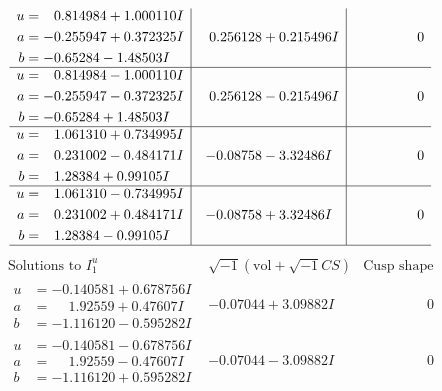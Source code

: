 \documentclass[1p]{elsarticle_modified}
\theoremstyle{definition}
\newcommand{\I}{\sqrt{-1}}
\begin{document}
$$\begin{array}{c|c|c}
\begin{aligned}
u &= \phantom{-}0.814984 + 1.000110 I \\
a &= -0.255947 + 0.372325 I \\
b &= -0.65284 - 1.48503 I\end{aligned}
 & \phantom{-}0.256128 + 0.215496 I & \phantom{-0.000000 } 0 \\ \hline\begin{aligned}
u &= \phantom{-}0.814984 - 1.000110 I \\
a &= -0.255947 - 0.372325 I \\
b &= -0.65284 + 1.48503 I\end{aligned}
 & \phantom{-}0.256128 - 0.215496 I & \phantom{-0.000000 } 0 \\ \hline\begin{aligned}
u &= \phantom{-}1.061310 + 0.734995 I \\
a &= \phantom{-}0.231002 - 0.484171 I \\
b &= \phantom{-}1.28384 + 0.99105 I\end{aligned}
 & -0.08758 - 3.32486 I & \phantom{-0.000000 } 0 \\ \hline\begin{aligned}
u &= \phantom{-}1.061310 - 0.734995 I \\
a &= \phantom{-}0.231002 + 0.484171 I \\
b &= \phantom{-}1.28384 - 0.99105 I\end{aligned}
 & -0.08758 + 3.32486 I & \phantom{-0.000000 } 0\\
 \hline 
 \end{array}$$\newpage$$\begin{array}{c|c|c}  
\text{Solutions to }I^u_{1}& \I (\text{vol} + \sqrt{-1}CS) & \text{Cusp shape}\\
 \hline 
\begin{aligned}
u &= -0.140581 + 0.678756 I \\
a &= \phantom{-}1.92559 + 0.47607 I \\
b &= -1.116120 - 0.595282 I\end{aligned}
 & -0.07044 + 3.09882 I & \phantom{-0.000000 } 0 \\ \hline\begin{aligned}
u &= -0.140581 - 0.678756 I \\
a &= \phantom{-}1.92559 - 0.47607 I \\
b &= -1.116120 + 0.595282 I\end{aligned}
 & -0.07044 - 3.09882 I & \phantom{-0.000000 } 0 \\ \hline\begin{aligned}

\end{aligned}
\end{array}$$
\end{document}
